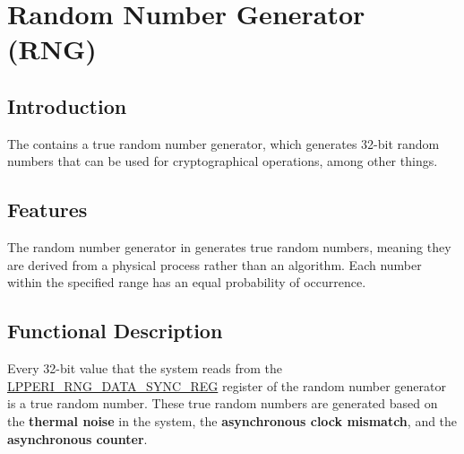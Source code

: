 \documentclass[main\_\_EN.tex]{subfiles}
\begin{document}

\ifglobal
\else
    {\let\clearpage\relax \listoftodos}
    {\let\clearpage\relax \listofdonetodos}
    \tableofcontents
\fi



\hypertarget{rng}{}
\chapter{Random Number Generator (RNG)}\label{mod:rng}

\section{Introduction}

The \chipname{} contains a true random number generator, which generates 32-bit random numbers that can be used for cryptographical operations, among other things.

\section{Features}

The random number generator in \chipname{} generates true random numbers, meaning they are derived from a physical process rather than an algorithm. Each number within the specified range has an equal probability of occurrence.

\section{Functional Description}\label{sec:rng-func-descr}

Every 32-bit value that the system reads from the \hyperref[regdesc:LPPERIRNGSYNCDATAREG]{LPPERI\_RNG\_DATA\_SYNC\_REG} register of the random number generator is a true random number. These true random numbers are generated based on the \textbf{thermal noise} in the system, the \textbf{asynchronous clock mismatch}, and the \textbf{asynchronous counter}.
\end{document}
